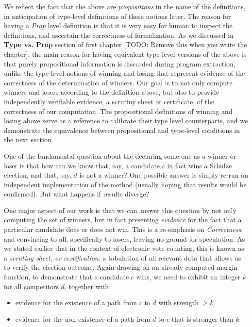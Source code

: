\noindent
We reflect the fact that the above are \emph{propositions} in
the name of the definitions, in anticipation of type-level
definitions of these notions later. The reason for having a \textit{Prop} level definition is that 
 it is very easy for human to inspect the definitions, and ascertain the correctness of formalization.
As we discussed in 
\textbf{Type vs. Prop} section of first chapter [TODO: Remove this when you write the 
chapter], the main reason 
for having equivalent
type-level versions of the above is that purely propositional
information is discarded during program extraction, unlike
the type-level notions of winning and losing that represent evidence
of the correctness of the determination of winners. Our goal is to 
not only compute winners and losers according to the
definition above, but also to provide independently verifiable
evidence, a scrutiny sheet or certificate, of the correctness of our computation.
The propositional
definitions of winning and losing above serve as a reference to
calibrate their type level counterparts, and we demonstrate the
equivalence between propositional and type-level conditions in the
next section. 


\label{sec:prop-type}
One of the fundamental question about the declaring some one 
as a winner or loser is that 
how can we know that, say, a candidate $c$ in fact wins a
Schulze election, and that, say, $d$ is not a winner? One possible 
answer is simply  re-run an independent implementation of the method
(usually hoping that results would be confirmed). But what happens
if results diverge?  

One major aspect of our work is that we can answer this question
by not only computing the set of winners, but in fact presenting
\emph{evidence} for the fact that a particular
candidate does or does not
win. This is a re-emphasis on \emph{Correctness},
and convincing to all, specifically to losers, leaving  no ground for speculation. 
As we stated earlier that in the context of
electronic vote counting, this is known as a
\emph{scrutiny sheet, or certification}: a tabulation of all relevant data that allows
us to verify the election outcome.
Again drawing on an already computed margin function, to
demonstrate that a candidate $c$ wins, we need to exhibit an integer
$k$ for all competitors $d$, together with
\begin{itemize}
  \item evidence for the existence of a path from $c$ to $d$ with
  strength $\geq k$
  \item evidence for the non-existence of a path from $d$ to $c$
  that is stronger than $k$
\end{itemize}


